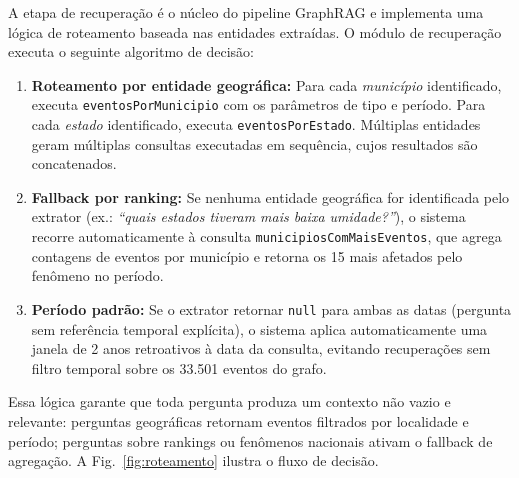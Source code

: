 \documentclass[conference]{IEEEtran}
\begin{document}
A etapa de recuperação é o núcleo do pipeline GraphRAG e implementa
uma lógica de roteamento baseada nas entidades extraídas.
O módulo de recuperação executa o seguinte algoritmo de decisão:

\begin{enumerate}
  \item \textbf{Roteamento por entidade geográfica:}
        Para cada \emph{município} identificado, executa
        \texttt{eventosPorMunicipio} com os parâmetros de tipo
        e período.
        Para cada \emph{estado} identificado, executa
        \texttt{eventosPorEstado}.
        Múltiplas entidades geram múltiplas consultas executadas
        em sequência, cujos resultados são concatenados.

  \item \textbf{Fallback por ranking:}
        Se nenhuma entidade geográfica for identificada pelo
        extrator (ex.: \emph{``quais estados tiveram mais baixa
        umidade?''}), o sistema recorre automaticamente à consulta
        \texttt{municipiosComMaisEventos}, que agrega contagens
        de eventos por município e retorna os 15 mais afetados
        pelo fenômeno no período.

  \item \textbf{Período padrão:}
        Se o extrator retornar \texttt{null} para ambas as datas
        (pergunta sem referência temporal explícita), o sistema
        aplica automaticamente uma janela de 2 anos retroativos
        à data da consulta, evitando recuperações sem filtro
        temporal sobre os 33.501 eventos do grafo.
\end{enumerate}

Essa lógica garante que toda pergunta produza um contexto
não vazio e relevante: perguntas geográficas retornam eventos
filtrados por localidade e período; perguntas sobre rankings
ou fenômenos nacionais ativam o fallback de agregação.
A Fig.~\ref{fig:roteamento} ilustra o fluxo de decisão.
\end{document}
